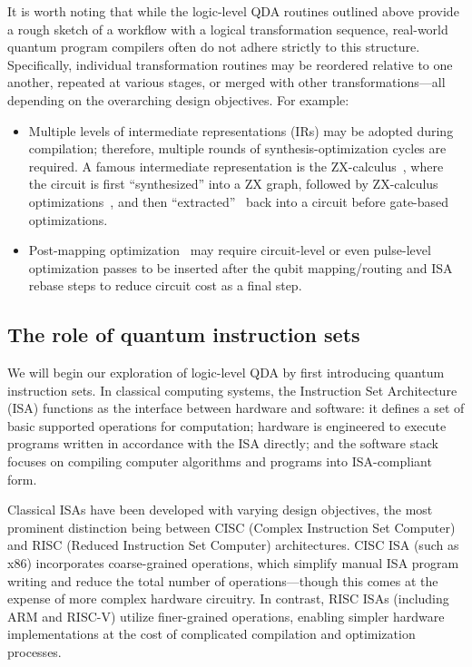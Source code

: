 \documentclass[a4paper,onecolumn,11pt,unpublished]{quantumarticle}
\begin{document}
It is worth noting that while the logic-level QDA routines outlined above provide a rough sketch of a workflow with a logical transformation sequence, real-world quantum program compilers often do not adhere strictly to this structure. Specifically, individual transformation routines may be reordered relative to one another, repeated at various stages, or merged with other transformations---all depending on the overarching design objectives. For example:
\begin{itemize}
    \item Multiple levels of intermediate representations (IRs) may be adopted during compilation; therefore, multiple rounds of synthesis-optimization cycles are required. A famous intermediate representation is the ZX-calculus~\cite{Kissinger2020Reducing}, where the circuit is first ``synthesized'' into a ZX graph, followed by ZX-calculus optimizations~\cite{Duncan2020Graphtheoretic}, and then ``extracted''~\cite{backensThereBackAgain2021} back into a circuit before gate-based optimizations. 
    \item Post-mapping optimization~\cite{wuQGoScalableQuantum2022} may require circuit-level or even pulse-level optimization passes to be inserted after the qubit mapping/routing and ISA rebase steps to reduce circuit cost as a final step.
\end{itemize}

\subsection{The role of quantum instruction sets}

We will begin our exploration of logic-level QDA by first introducing quantum instruction sets. In classical computing systems, the Instruction Set Architecture (ISA) functions as the interface between hardware and software: it defines a set of basic supported operations for computation; hardware is engineered to execute programs written in accordance with the ISA directly; and the software stack focuses on compiling computer algorithms and programs into ISA-compliant form.

Classical ISAs have been developed with varying design objectives, the most prominent distinction being between CISC (Complex Instruction Set Computer) and RISC (Reduced Instruction Set Computer) architectures. CISC ISA (such as x86) incorporates coarse-grained operations, which simplify manual ISA program writing and reduce the total number of operations---though this comes at the expense of more complex hardware circuitry. In contrast, RISC ISAs (including ARM and RISC-V) utilize finer-grained operations, enabling simpler hardware implementations at the cost of complicated compilation and optimization processes.
\end{document}
